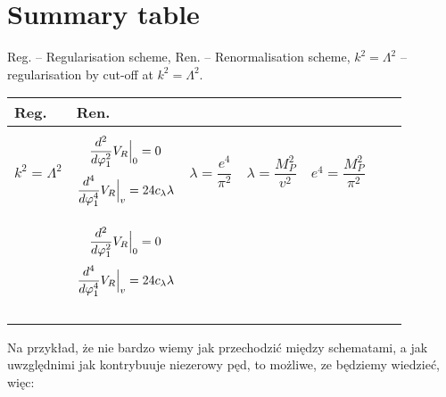 \section{Summary table}
Reg. -- Regularisation scheme, Ren. -- Renormalisation scheme, $k^2=\Lambda^2$ -- regularisation 
by cut-off at $k^2=\Lambda^2$.
\newpage
\begin{longtable}[c]{|C{1.5cm}|C{3cm}|C{2cm}|C{2cm}|C{2cm}|C{4cm}|C{4cm}|}
\hline
Reg.&Ren.&&& &&\\
\hline
$k^2 = \Lambda^2$&
\begin{equation*}
{\frac{d^{2}}{d \varphi_1^{2}}V_R\Big|_{0}} = 0
\end{equation*}
\begin{equation*}
{\frac{d^{4}}{d \varphi_1^{4}}V_R\Big|_{v}} = 24c_\lambda\lambda
\end{equation*}&
\begin{equation*}
\lambda=\frac{e^4}{\pi^2}
\end{equation*}&
\begin{equation*}
\lambda=\frac{M_P^2}{v^2}
\end{equation*}& 
\begin{equation*}
e^4=\frac{M_P^2}{\pi^2}
\end{equation*}&&\\
\hline
\parbox[t]{5mm}{}&
\begin{equation*}{\frac{d^{2}}{d \varphi_1^{2}}V_R\Big|_{0}} = 0\end{equation*}\begin{equation*}
{\frac{d^{4}}{d \varphi_1^{4}}V_R\Big|_{v}} = 24c_\lambda\lambda\end{equation*}&&&&&\\
&&&&&&\\
&&&&&&\\
&&&&&&\\
\hline
\end{longtable}

Na przykład, że nie bardzo wiemy jak przechodzić między schematami, a jak uwzględnimi jak 
 kontrybuuje niezerowy pęd, to możliwe, ze będziemy wiedzieć, więc:





